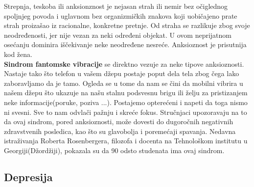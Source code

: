 \documentclass[a4paper]{article}
\begin{document}
{		Strepnja, teskoba ili anksionznost je nejasan strah ili nemir bez očiglednog spoljnjeg povoda i uglavnom bez organizmičkih znakova koji uobičajeno prate strah proizašao iz racionalne, konkretne pretnje. Od straha se razlikuje zbog svoje neodređenosti, jer nije vezan za neki određeni objekat. U ovom neprijatnom osećanju dominira iščekivanje neke neodređene nesreće. Anksioznost je prisutnija kod žena. \\
		\textbf{Sindrom fantomske vibracije} se direktno vezuje za neke tipove anksioznosti. Nastaje tako što telefon u vašem džepu postaje poput dela tela zbog čega lako zaboravljamo da je tamo. Ogleda se u tome da nam se čini da mobilni vibrira u našem džepu što ukazuje na našu stalnu podsvesnu brigu ili želju za pristizanjem neke informacije(poruke, poziva ...). Postajemo opterećeni i napeti da toga nismo ni svesni. Sve to nam odvlači pažnju i skreće fokus. Stručnjaci upozoravaju na to da ovaj sindrom, pored anksioznosti, može dovesti do dugoročnih negativnih zdravstvenih posledica, kao što su glavobolja i poremećaji spavanja. Nedavna istraživanja Roberta Rosenbergera, filozofa i docenta na Tehnološkom institutu u Georgiji(Džordžiji), pokazala su da 90 odsto studenata ima ovaj sindrom.
		
		\subsection{Depresija}
		\label{subsec:depresija}
		
}
\end{document}
